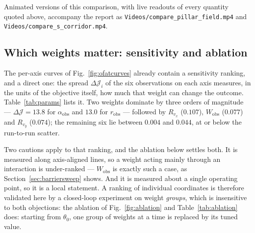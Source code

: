 \documentclass[11pt,a4paper]{article}
\newcommand{\Wobs}{W_{\mathrm{obs}}}
\newcommand{\aobs}{\alpha_{\mathrm{obs}}}
\newcommand{\robs}{r_{\mathrm{obs}}}
\newcommand{\thn}{\theta_0}
\begin{document}
Animated versions of this comparison, with live readouts of every quantity quoted above, accompany the report
as \texttt{Videos/compare\_pillar\_field.mp4} and \texttt{Videos/compare\_s\_corridor.mp4}.

\subsection{Which weights matter: sensitivity and ablation}
\label{sec:sensitivity}

The per-axis curves of Fig.~\ref{fig:ofatcurves} already contain a sensitivity ranking, and a direct one:
the spread $\Delta\mathcal{J}_i$ of the six observations on each axis measures, in the units of the objective
itself, how much that weight can change the outcome. Table~\ref{tab:params} lists it. Two weights dominate by
three orders of magnitude --- $\Delta\mathcal{J}=13.8$ for $\aobs$ and $13.0$ for $\robs$ --- followed by
$R_{v_x}$ ($0.107$), $\Wobs$ ($0.077$) and $R_{v_y}$ ($0.074$); the remaining six lie between $0.004$ and
$0.044$, at or below the run-to-run scatter.

Two cautions apply to that ranking, and the ablation below settles both. It is measured along axis-aligned
lines, so a weight acting mainly through an interaction is under-ranked --- $\Wobs$ is exactly such a case,
as Section~\ref{sec:barriersweep} shows. And it is measured about a single operating point, so it is a local
statement. A ranking of individual coordinates is therefore validated here by a closed-loop experiment on
weight \emph{groups}, which is insensitive to both objections: the ablation of Fig.~\ref{fig:ablation} and Table~\ref{tab:ablation} does: starting from $\thn$, one group of
weights at a time is replaced by its tuned value.
\end{document}
